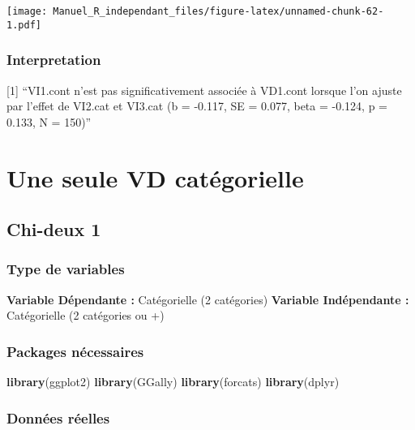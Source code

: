 \documentclass[
]{book}
\newenvironment{Shaded}{\begin{snugshade}}{\end{snugshade}}
\newcommand{\KeywordTok}[1]{\textcolor[rgb]{0.13,0.29,0.53}{\textbf{#1}}}
\newcommand{\NormalTok}[1]{#1}
\begin{document}
\texttt{[image: Manuel\_R\_independant\_files/figure-latex/unnamed-chunk-62-1.pdf]}

\hypertarget{interpretation-6}{%
\subsubsection{Interpretation}\label{interpretation-6}}

{[}1{]} ``VI1.cont n'est pas significativement associée à VD1.cont lorsque l'on ajuste par l'effet de VI2.cat et VI3.cat (b = -0.117, SE = 0.077, beta = -0.124, p = 0.133, N = 150)''

\hypertarget{une-seule-vd-catuxe9gorielle}{%
\section{Une seule VD catégorielle}\label{une-seule-vd-catuxe9gorielle}}

\hypertarget{chi-deux-1}{%
\subsection{Chi-deux 1}\label{chi-deux-1}}

\hypertarget{type-de-variables-7}{%
\subsubsection{Type de variables}\label{type-de-variables-7}}

\textbf{Variable Dépendante :} Catégorielle (2 catégories)
\textbf{Variable Indépendante :} Catégorielle (2 catégories ou +)

\hypertarget{packages-nuxe9cessaires-7}{%
\subsubsection{Packages nécessaires}\label{packages-nuxe9cessaires-7}}

\begin{Shaded}
\begin{Highlighting}[]
\KeywordTok{library}\NormalTok{(ggplot2)}
\KeywordTok{library}\NormalTok{(GGally)}
\KeywordTok{library}\NormalTok{(forcats)}
\KeywordTok{library}\NormalTok{(dplyr)}
\end{Highlighting}
\end{Shaded}

\hypertarget{donnuxe9es-ruxe9elles-7}{%
\subsubsection{Données réelles}\label{donnuxe9es-ruxe9elles-7}}
\end{document}
